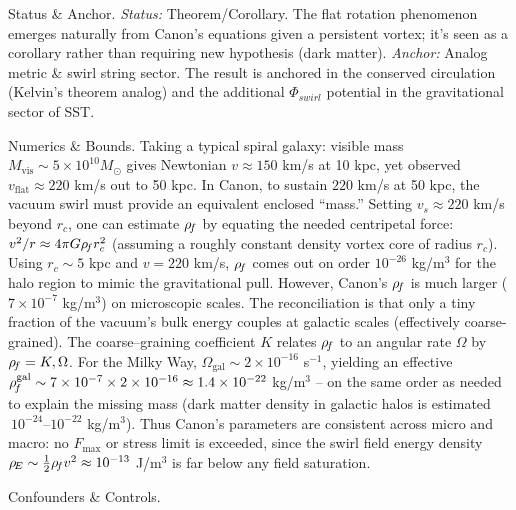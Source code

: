 \documentclass[11pt]{article}
\begin{document}
Status & Anchor. \textit{Status:} Theorem/Corollary. The flat rotation phenomenon emerges naturally from Canon’s equations given a persistent vortex; it’s seen as a corollary rather than requiring new hypothesis (dark matter). \textit{Anchor:} Analog metric & swirl string sector. The result is anchored in the conserved circulation (Kelvin’s theorem analog) and the additional $\Phi_{swirl}$ potential in the gravitational sector of SST.


Numerics & Bounds. Taking a typical spiral galaxy: visible mass $M_{\text{vis}} \sim 5\times10^{10} M_\odot$ gives Newtonian $v \approx 150$ km/s at 10 kpc, yet observed $v_{\text{flat}}\approx 220$ km/s out to 50 kpc. In Canon, to sustain $220$ km/s at 50 kpc, the vacuum swirl must provide an equivalent enclosed “mass.” Setting $v_{s}\approx 220$ km/s beyond $r_c$, one can estimate $\rho_{\!f}$ by equating the needed centripetal force: $v^2/r \approx 4\pi G \rho_{\!f} r_c^2$ (assuming a roughly constant density vortex core of radius $r_c$). Using $r_c \sim 5$ kpc and $v=220$ km/s, $\rho_{\!f}$ comes out on order $10^{-26}$ kg/m$^3$ for the halo region to mimic the gravitational pull. However, Canon’s $\rho_{\!f}$ is much larger ($7\times10^{-7}$ kg/m$^3$) on microscopic scales. The reconciliation is that only a tiny fraction of the vacuum’s bulk energy couples at galactic scales (effectively coarse-grained). The coarse–graining coefficient $K$ relates $\rho_{\!f}$ to an angular rate $\Omega$ by $\rho_{\!f} = K,\Omega$. For the Milky Way, $\Omega_{\text{gal}}\sim 2\times10^{-16}$ s$^{-1}$, yielding an effective $\rho_{\!f}^{\text{gal}} \sim 7\times10^{-7} \times 2\times10^{-16} \approx 1.4\times10^{-22}$ kg/m$^3$ – on the same order as needed to explain the missing mass (dark matter density in galactic halos is estimated $~10^{-24}$–$10^{-22}$ kg/m$^3$). Thus Canon’s parameters are consistent across micro and macro: no $F_{\max}$ or stress limit is exceeded, since the swirl field energy density $\rho_{\!E} \sim \tfrac{1}{2}\rho_{\!f} v^2 \approx 10^{-13}$ J/m$^3$ is far below any field saturation.


Confounders & Controls.
\end{document}

